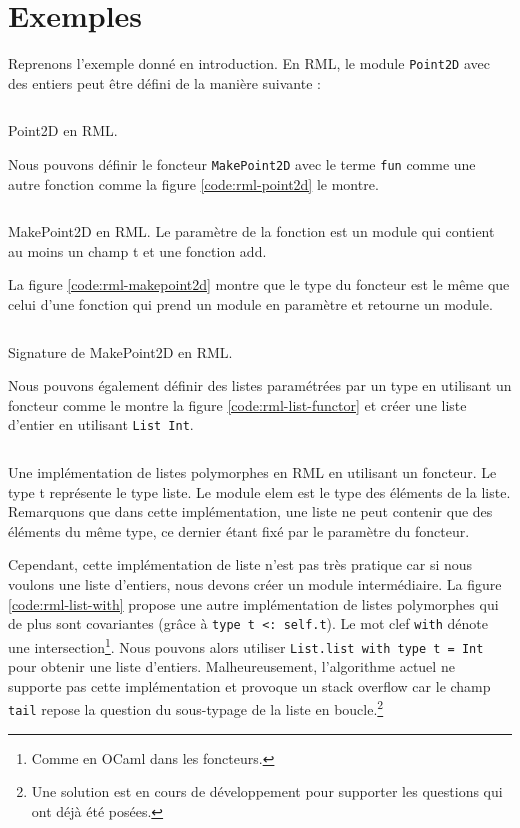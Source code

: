 \section{Exemples}

Reprenons l'exemple donné en introduction. En RML, le module \verb|Point2D| avec
des entiers peut être défini de la manière suivante :

\begin{listing}
  \inputminted{OCaml}{codes/point2d.rml}
  \caption{Point2D en RML.}
\end{listing}

Nous pouvons définir le foncteur \verb|MakePoint2D| avec le terme \verb|fun|
comme une autre fonction comme la figure \ref{code:rml-point2d} le montre. 

\begin{listing}
  \inputminted{OCaml}{codes/makepoint2d.rml}
  \caption{MakePoint2D en RML. Le paramètre de la fonction est un module qui
    contient au moins un champ t et une fonction add.}
  \label{code:rml-point2d}
\end{listing}

La figure \ref{code:rml-makepoint2d} montre que le type du foncteur est le même
que celui d'une fonction qui prend un module en paramètre et retourne un module.

\begin{listing}
  \inputminted{OCaml}{codes/makepoint2d_sig.rml}
  \caption{Signature de MakePoint2D en RML.}
  \label{code:rml-makepoint2d}
\end{listing}

Nous pouvons également définir des listes paramétrées par un type en utilisant un foncteur
comme le montre la figure \ref{code:rml-list-functor} et créer une liste d'entier en
utilisant \verb|List Int|.

\begin{listing}
  \inputminted{OCaml}{codes/list_functor.rml}
  \caption{Une implémentation de listes polymorphes en RML en utilisant un
    foncteur. Le type t représente le type liste. Le module elem
    est le type des éléments de la liste. Remarquons que dans cette
    implémentation, une liste ne peut contenir que des éléments du même type, ce
    dernier étant fixé par le paramètre du foncteur.}
  \label{code:rml-list-functor}
\end{listing}

Cependant, cette implémentation de liste n'est pas très pratique car si nous
voulons une liste d'entiers, nous devons créer un module intermédiaire. La figure
\ref{code:rml-list-with} propose une autre implémentation de listes polymorphes
qui de plus sont covariantes (grâce à \verb|type t <: self.t|). Le mot clef
\verb|with| dénote une intersection\footnote{Comme en OCaml dans
  les foncteurs.}. Nous pouvons alors utiliser \verb|List.list with type t = Int|
pour obtenir une liste d'entiers. Malheureusement, l'algorithme actuel ne
supporte pas cette implémentation et provoque un stack overflow car le champ
\verb|tail| repose la question du sous-typage de la liste en
boucle.\footnote{Une solution est en cours de développement pour supporter les
  questions qui ont déjà été posées.}

